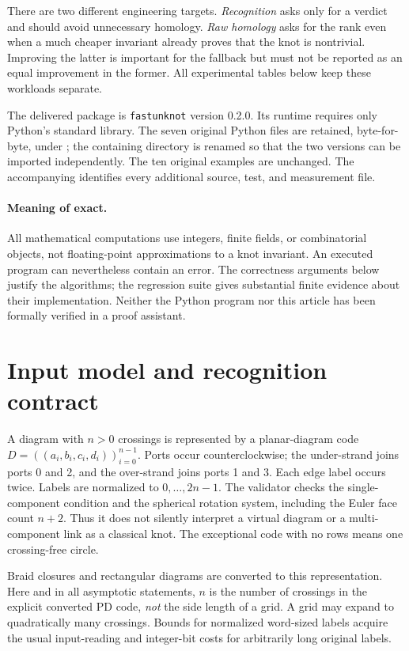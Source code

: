 \documentclass[11pt,letterpaper]{article}
\theoremstyle{definition}
\begin{document}
There are two different engineering targets. \emph{Recognition} asks only for a
verdict and should avoid unnecessary homology. \emph{Raw homology} asks for the
rank even when a much cheaper invariant already proves that the knot is
nontrivial. Improving the latter is important for the fallback but must not be
reported as an equal improvement in the former. All experimental tables below
keep these workloads separate.

The delivered package is \texttt{fastunknot} version 0.2.0. Its runtime requires
only Python's standard library. The seven original Python files are retained,
byte-for-byte, under ; the containing directory is
renamed so that the two versions can be imported independently. The ten original
examples are unchanged. The accompanying  identifies every
additional source, test, and measurement file.

\paragraph{Meaning of exact.}
All mathematical computations use integers, finite fields, or combinatorial
objects, not floating-point approximations to a knot invariant. An executed
program can nevertheless contain an error. The correctness arguments below
justify the algorithms; the regression suite gives substantial finite evidence
about their implementation. Neither the Python program nor this article has
been formally verified in a proof assistant.

\section[Input and correctness]{Input model and recognition contract}

A diagram with $n>0$ crossings is represented by a planar-diagram code
$D=((a_i,b_i,c_i,d_i))_{i=0}^{n-1}$. Ports occur counterclockwise; the under-strand
joins ports 0 and 2, and the over-strand joins ports 1 and 3. Each edge label
occurs twice. Labels are normalized to $0,\ldots,2n-1$. The validator checks the
single-component condition and the spherical rotation system, including the
Euler face count $n+2$. Thus it does not silently interpret a virtual diagram or
a multi-component link as a classical knot. The exceptional code with no rows
means one crossing-free circle.

Braid closures and rectangular diagrams are converted to this representation.
Here and in all asymptotic statements, $n$ is the number of crossings in the
explicit converted PD code, \emph{not} the side length of a grid. A grid may
expand to quadratically many crossings. Bounds for normalized word-sized labels
acquire the usual input-reading and integer-bit costs for arbitrarily long
original labels.
\end{document}
